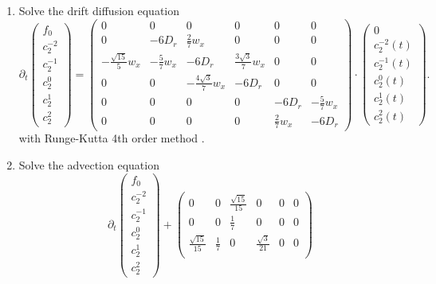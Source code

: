 \begin{frame}
	\scriptsize
	\begin{enumerate}
		\item Solve the drift diffusion equation
		\begin{equation*}
			\partial_t \left(\begin{array}{c}
				f_0 \\
				c_2^{-2} \\
				c_2^{-1} \\
				c_2^0 \\
				c_2^1 \\
				c_2^2
			\end{array}\right)  = \begin{pmatrix}
				0 & 0 & 0 & 0 & 0 & 0 \\
				0 & -6D_r & \frac{2}{7}w_x & 0 & 0 & 0 \\
				-\frac{\sqrt{15}}{5}w_x & -\frac{5}{7}w_x & -6D_r & \frac{3\sqrt{3}}{7}w_x & 0 & 0 \\
				0 & 0 & -\frac{4\sqrt{3}}{7}w_x & -6D_r & 0 & 0 \\
				0 & 0 & 0 & 0 & -6D_r & -\frac{5}{7} w_x\\
				0 & 0 & 0 & 0 & \frac{2}{7}w_x & -6D_r
			\end{pmatrix} \cdot
			\left(\begin{array}{c}
				0 \\
				c^{-2}_2(t) \\
				c_2^{-1}(t) \\
				c_2^0(t) \\
				c_2^1(t) \\
				c_2^2(t)
			\end{array}\right).
		\end{equation*}
		with Runge-Kutta 4th order method .
		\item Solve the advection equation
		$$
		\partial_t \left(\begin{array}{c}
			f_0 \\
			c_2^{-2} \\
			c_2^{-1} \\
			c_2^0 \\
			c_2^1 \\
			c_2^2
		\end{array}\right) + \begin{pmatrix}
			0 & 0 & \frac{\sqrt{15}}{15} & 0 & 0 & 0 \\
			0 & 0 & \frac{1}{7} & 0 & 0 & 0 \\
			\frac{\sqrt{15}}{15} & \frac{1}{7} & 0 & \frac{\sqrt{3}}{21} & 0 &  0 \\

\end{pmatrix}$$
\end{enumerate}
\end{frame}
